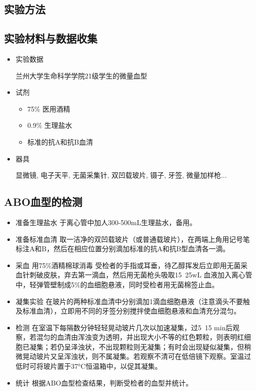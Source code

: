 \documentclass[AutoFakeBold]{LZUThesis}
\begin{document}
\begin{enumerate}
\section{实验方法}
\subsection{实验材料与数据收集}
\begin{itemize}
    \item 实验数据\par
    兰州大学生命科学学院21级学生的微量血型

    \item 试剂\par
    \begin{itemize}
        \item 75\% 医用酒精\par
        \item 0.9\% 生理盐水\par
        \item 标准的抗A和抗B血清\par
    \end{itemize}

    \item 器具\par
    显微镜, 电子天平, 无菌采集针, 双凹载玻片, 镊子, 牙签, 微量加样枪...

\end{itemize}
\subsection{ABO血型的检测}
\begin{itemize}
    \item 准备生理盐水
    于离心管中加人300-500mL生理盐水，备用。
    \item 准备标准血清
    取一洁净的双凹载玻片（或普通载玻片），在两端上角用记号笔标注A和B，然后在相应位置分别滴加标准的抗A和抗B型血清各一滴。
    \item 采血
    用75\%酒精棉球消毒 受检者的手指或耳垂，待乙醇挥发后立即用无菌采血针刺破皮肤，弃去第一滴血，然后用无菌枪头吸取15~25wL
    血液加入离心管中，轻弹管壁制成5\%的血细胞悬液，同时受检者用无菌棉签止血。
    \item 凝集实验
    在玻片的两种标准血清中分别滴加1滴血细胞悬液（注意滴头不要触及标准血清），立即用不同的牙签分别搅拌使血细胞悬液和血清充分混匀。
    \item 检测
    在室温下每隔数分钟轻轻晃动玻片几次以加速凝集，过5~15
    min后观察，若混匀的血清由浑浊变为透明，并出现大小不等的红色颗粒，则表明红细胞已凝集；若仍呈泽浊状，不出现颗粒则无凝集；有时会出现疑似凝集，但稍微晃动玻片又呈浑浊状，则不属凝集。若观察不清可在低倍镜下观察。室温过低时可将玻片置于37°C恒温箱中，以促其凝集。
    \item 统计
    根据ABO血型检查结果，判断受检者的血型并统计。
\end{itemize}


\end{enumerate}
\end{document}
